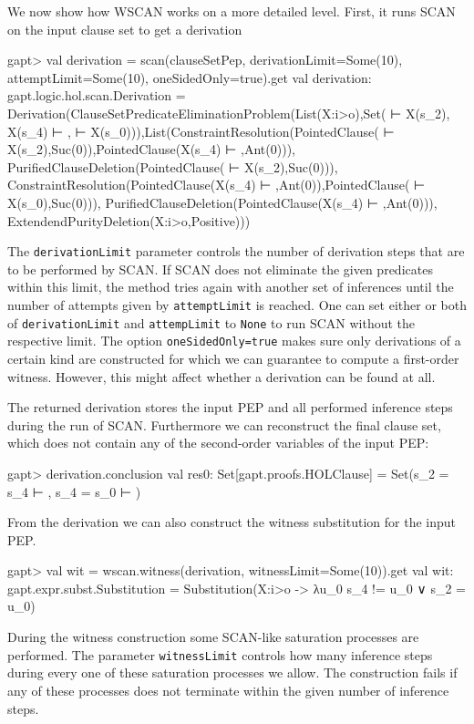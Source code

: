 \documentclass[a4paper,11pt]{book}
\begin{document}
We now show how WSCAN works on a more detailed level.
First, it runs SCAN on the input clause set to get a derivation
\begin{clilisting}
  gapt> val derivation = scan(clauseSetPep, derivationLimit=Some(10), attemptLimit=Some(10), oneSidedOnly=true).get
  val derivation: gapt.logic.hol.scan.Derivation = Derivation(ClauseSetPredicateEliminationProblem(List(X:i>o),Set( ⊢ X(s_2), X(s_4) ⊢ ,  ⊢ X(s_0))),List(ConstraintResolution(PointedClause( ⊢ X(s_2),Suc(0)),PointedClause(X(s_4) ⊢ ,Ant(0))), PurifiedClauseDeletion(PointedClause( ⊢ X(s_2),Suc(0))), ConstraintResolution(PointedClause(X(s_4) ⊢ ,Ant(0)),PointedClause( ⊢ X(s_0),Suc(0))), PurifiedClauseDeletion(PointedClause(X(s_4) ⊢ ,Ant(0))), ExtendendPurityDeletion(X:i>o,Positive)))

\end{clilisting}
The \texttt{derivationLimit} parameter controls the number of derivation steps that are to be performed by SCAN.
If SCAN does not eliminate the given predicates within this limit, the method tries again with another set of inferences until the number of attempts given by \texttt{attemptLimit} is reached.
One can set either or both of \texttt{derivationLimit} and \texttt{attempLimit} to \texttt{None} to run SCAN without the respective limit.
The option \texttt{oneSidedOnly=true} makes sure only derivations of a certain kind are constructed for which we can guarantee to compute a first-order witness.
However, this might affect whether a derivation can be found at all.

The returned derivation stores the input PEP and all performed inference steps during the run of SCAN.
Furthermore we can reconstruct the final clause set, which does not contain any of the second-order variables of the input PEP:
\begin{clilisting}
  gapt> derivation.conclusion
  val res0: Set[gapt.proofs.HOLClause] = Set(s_2 = s_4 ⊢ , s_4 = s_0 ⊢ )

\end{clilisting}
From the derivation we can also construct the witness substitution for the input PEP.
\begin{clilisting}
  gapt> val wit = wscan.witness(derivation, witnessLimit=Some(10)).get
  val wit: gapt.expr.subst.Substitution = Substitution(X:i>o -> λu_0 s_4 != u_0 ∨ s_2 = u_0)

\end{clilisting}
During the witness construction some SCAN-like saturation processes are performed.
The parameter \texttt{witnessLimit} controls how many inference steps during every one of these saturation processes we allow.
The construction fails if any of these processes does not terminate within the given number of inference steps.
\end{document}
